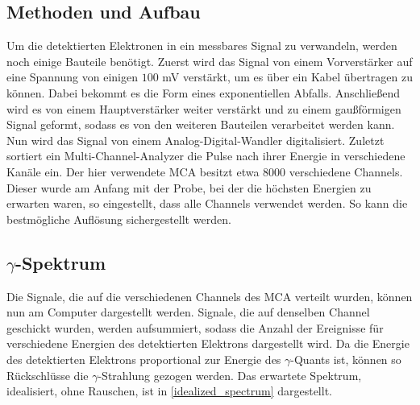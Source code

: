 \subsection{Methoden und Aufbau}
Um die detektierten Elektronen in ein messbares Signal zu verwandeln, werden noch einige Bauteile benötigt. Zuerst wird das Signal von einem Vorverstärker auf eine Spannung von einigen $100$ mV verstärkt, um es über ein Kabel übertragen zu können. Dabei bekommt es die Form eines exponentiellen Abfalls. Anschließend wird es von einem Hauptverstärker weiter verstärkt und zu einem gaußförmigen Signal geformt, sodass es von den weiteren Bauteilen verarbeitet werden kann. Nun wird das Signal von einem Analog-Digital-Wandler digitalisiert. Zuletzt sortiert ein Multi-Channel-Analyzer die Pulse nach ihrer Energie in verschiedene Kanäle ein. Der hier verwendete MCA besitzt etwa $8000$ verschiedene Channels. Dieser wurde am Anfang mit der Probe, bei der die höchsten Energien zu erwarten waren, so eingestellt, dass alle Channels verwendet werden. So kann die bestmögliche Auflösung sichergestellt werden.

\subsection{$\gamma$-Spektrum}
Die Signale, die auf die verschiedenen Channels des MCA verteilt wurden, können nun am Computer dargestellt werden. Signale, die auf denselben Channel geschickt wurden, werden aufsummiert, sodass die Anzahl der Ereignisse für verschiedene Energien des detektierten Elektrons dargestellt wird. Da die Energie des detektierten Elektrons proportional zur Energie des $\gamma$-Quants ist, können so Rückschlüsse die $\gamma$-Strahlung gezogen werden. Das erwartete Spektrum, idealisiert, ohne Rauschen, ist in \cref{idealized_spectrum} dargestellt.

